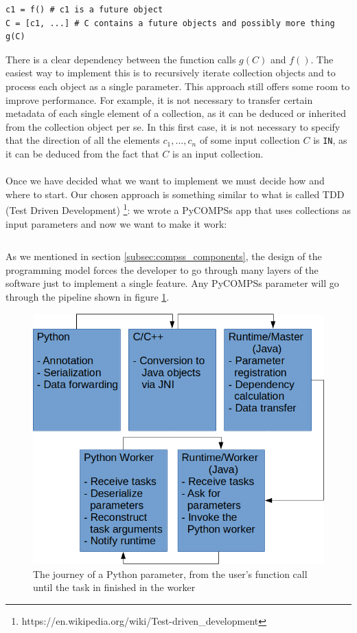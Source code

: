 \begin{verbatim}
c1 = f() # c1 is a future object
C = [c1, ...] # C contains a future objects and possibly more thing
g(C)
\end{verbatim}
There is a clear dependency between the function calls $g(C)$ and $f()$. The easiest way to implement this is to recursively iterate collection objects and to process each object as a single parameter. This approach still offers some room to improve performance. For example, it is not necessary to transfer certain metadata of each single element of a collection, as it can be deduced or inherited from the collection object per se. In this first case, it is not necessary to specify that the direction of all the elements $c_1, ..., c_n$ of some input collection $C$ is \verb|IN|, as it can be deduced from the fact that $C$ is an input collection.\\
\\
Once we have decided what we want to implement we must decide how and where to start. Our chosen approach is something similar to what is called TDD (Test Driven Development) \footnote{https://en.wikipedia.org/wiki/Test-driven\_development}: we wrote a PyCOMPSs app that uses collections as input parameters and now we want to make it work:

\inputminted{python}{applications/COLLECTION_IN/resources_in_master.py}

As we mentioned in section \ref{subsec:compss_components}, the design of the programming model forces the developer to go through many layers of the software just to implement a single feature. Any PyCOMPSs parameter will go through the pipeline shown in figure \ref{fig:parameter_pipeline}.

\begin{figure}[ht!]
\centering
\includegraphics[scale = 0.5]{figures/parameter_pipeline.png}
\caption{The journey of a Python parameter, from the user's function call until the task in finished in the worker}
\label{fig:parameter_pipeline}
\end{figure}

